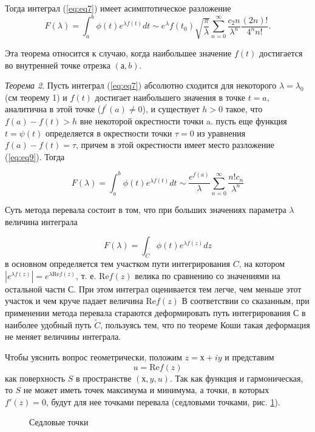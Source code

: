 \documentclass[14pt]{extarticle}
\renewcommand{\Re}{\mathrm{Re}}
\renewcommand{\Re}{\mathrm{Re}}
\begin{document}
Тогда интеграл (\ref{eq:eq7}) имеет асимптотическое разложение
$$
F(\lambda)=\int_{a}^{b}\phi(t)e^{\lambda f(t)}dt \sim e^\lambda f(t_0) \sqrt{\frac{\pi}{\lambda}} \sum_{n=0}^{\infty}\frac{c_2n}{\lambda^n}\frac{(2n)!}{4^n n!}.
$$

Эта теорема относится к случаю, когда наибольшее значение $f(t)$ достигается во внутренней точке отрезка $(а, b)$. 

\textit{Теорема 2\label{th:th2}}. Пусть интеграл (\ref{eq:eq7}) абсолютно сходится для некоторого $\lambda = \lambda_0$ (см теорему 1) и $f(t)$ достигает наибольшего значения в точке $t=a$, аналитична в этой точке ($f^\prime(a) \neq 0$), и существует $h>0$ такое, что $f(a)-f(t)>h$ вне некоторой окрестности точки a. пусть еще функция $t=\psi(t)$ определяется в окрестности точки $\tau=0$ из уравнения $f(a) - f(t) = \tau$, причем в этой окрестности имеет место разложение (\ref{eq:eq9}). Тогда

\begin{equation}\label{eq:eq10}
F(\lambda) = \int_{a}^{b}\phi(t)e^{\lambda f(t)}dt \sim \frac{e^{f(a)}}{\lambda}\sum_{n=0}^{\infty}\frac{n! c_n}{\lambda^n}
\end{equation}

Суть метода перевала состоит в том, что при больших значениях параметра $\lambda$ величина интеграла

$$
F(\lambda) = \int_{C}^{}\phi(t)e^{\lambda f(z)}dz
$$
в основном определяется тем участком пути интегрирования $C$, на котором $|e^{\lambda f(z)}|=e^{\lambda \Re f(z)}$, т. е. $\Re f(z)$ велика по сравнению со значениями на остальной части $С$. При этом интеграл оценивается тем легче, чем меньше этот участок и чем круче падает величина $\Re f(z)$ В соответствии со сказанным, при применении метода перевала стараются деформировать путь интегрирования С в наиболее удобный путь $\widetilde{C}$, пользуясь тем, что по теореме Коши такая деформация не меняет величины интеграла.\cite{Lavrentyev}

Чтобы уяснить вопрос геометрически, положим $z = х + iy$ и представим
$$
u = \Re f(z)
$$
как поверхность $S$ в пространстве $(х, y, u)$. Так как функция и гармоническая, то $S$ не может иметь точек максимума и минимума, а точки, в которых $f'(z) = 0$, будут для нее точками перевала (седловыми точками, рис. \ref{ris:image2}).

\begin{figure}[h]
	\caption{Седловые точки}
	\label{ris:image2}
	\end{figure}
	
\end{document}
